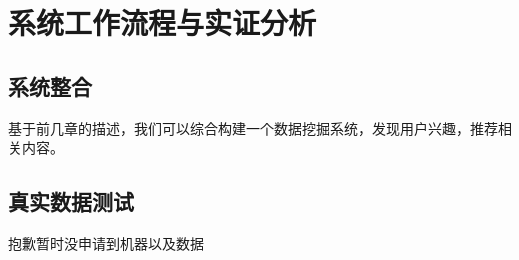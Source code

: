 \chapter{系统工作流程与实证分析}
\section{系统整合}
基于前几章的描述，我们可以综合构建一个数据挖掘系统，发现用户兴趣，推荐相关内容。
\section{真实数据测试}
抱歉暂时没申请到机器以及数据